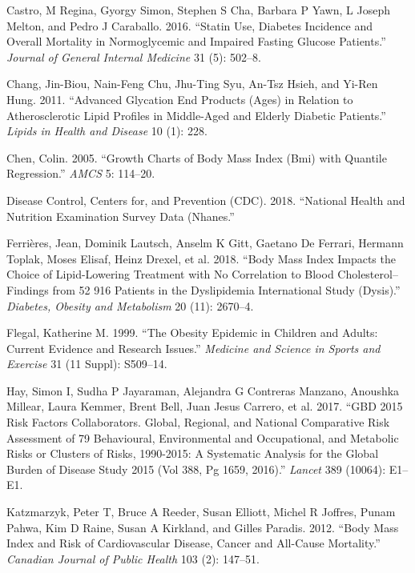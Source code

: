 \documentclass[
  12pt,
]{article}
\begin{document}
\leavevmode\hypertarget{ref-castro2016}{}%
Castro, M Regina, Gyorgy Simon, Stephen S Cha, Barbara P Yawn, L Joseph Melton, and Pedro J Caraballo. 2016. ``Statin Use, Diabetes Incidence and Overall Mortality in Normoglycemic and Impaired Fasting Glucose Patients.'' \emph{Journal of General Internal Medicine} 31 (5): 502--8.

\leavevmode\hypertarget{ref-chang2011}{}%
Chang, Jin-Biou, Nain-Feng Chu, Jhu-Ting Syu, An-Tsz Hsieh, and Yi-Ren Hung. 2011. ``Advanced Glycation End Products (Ages) in Relation to Atherosclerotic Lipid Profiles in Middle-Aged and Elderly Diabetic Patients.'' \emph{Lipids in Health and Disease} 10 (1): 228.

\leavevmode\hypertarget{ref-chen2005}{}%
Chen, Colin. 2005. ``Growth Charts of Body Mass Index (Bmi) with Quantile Regression.'' \emph{AMCS} 5: 114--20.

\leavevmode\hypertarget{ref-NHANES}{}%
Disease Control, Centers for, and Prevention (CDC). 2018. ``National Health and Nutrition Examination Survey Data (Nhanes.''

\leavevmode\hypertarget{ref-ferrieres2018}{}%
Ferrières, Jean, Dominik Lautsch, Anselm K Gitt, Gaetano De Ferrari, Hermann Toplak, Moses Elisaf, Heinz Drexel, et al. 2018. ``Body Mass Index Impacts the Choice of Lipid-Lowering Treatment with No Correlation to Blood Cholesterol--Findings from 52 916 Patients in the Dyslipidemia International Study (Dysis).'' \emph{Diabetes, Obesity and Metabolism} 20 (11): 2670--4.

\leavevmode\hypertarget{ref-flegal1999}{}%
Flegal, Katherine M. 1999. ``The Obesity Epidemic in Children and Adults: Current Evidence and Research Issues.'' \emph{Medicine and Science in Sports and Exercise} 31 (11 Suppl): S509--14.

\leavevmode\hypertarget{ref-hay2017gbd}{}%
Hay, Simon I, Sudha P Jayaraman, Alejandra G Contreras Manzano, Anoushka Millear, Laura Kemmer, Brent Bell, Juan Jesus Carrero, et al. 2017. ``GBD 2015 Risk Factors Collaborators. Global, Regional, and National Comparative Risk Assessment of 79 Behavioural, Environmental and Occupational, and Metabolic Risks or Clusters of Risks, 1990-2015: A Systematic Analysis for the Global Burden of Disease Study 2015 (Vol 388, Pg 1659, 2016).'' \emph{Lancet} 389 (10064): E1--E1.

\leavevmode\hypertarget{ref-katbody}{}%
Katzmarzyk, Peter T, Bruce A Reeder, Susan Elliott, Michel R Joffres, Punam Pahwa, Kim D Raine, Susan A Kirkland, and Gilles Paradis. 2012. ``Body Mass Index and Risk of Cardiovascular Disease, Cancer and All-Cause Mortality.'' \emph{Canadian Journal of Public Health} 103 (2): 147--51.
\end{document}
